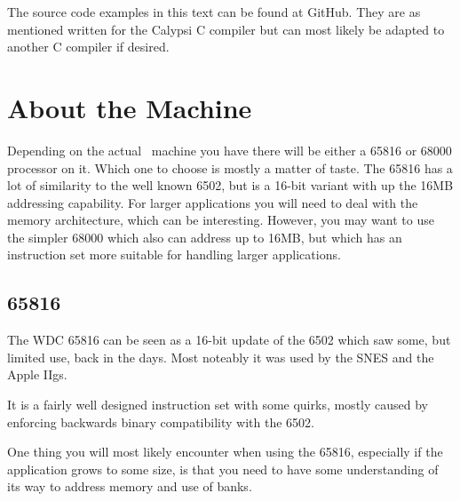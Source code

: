 The source code examples in this text can be found at GitHub. They are
as mentioned written for the Calypsi C compiler but can most likely be
adapted to another C compiler if desired.

\section*{About the Machine}

Depending on the actual \foenix\ machine you have there will be either
a 65816 or 68000 processor on it. Which one to choose is mostly a
matter of taste. The 65816 has a lot of similarity to the well known
6502, but is a 16-bit variant with up the 16MB addressing
capability. For larger applications you will need to deal with the
memory architecture, which can be interesting. However, you may want
to use the simpler 68000 which also can address up to 16MB, but which
has an instruction set more suitable for handling larger applications.

\begin{leftbar}
\subsection*{65816}

The WDC 65816 can be seen as a 16-bit update of the 6502 which saw
some, but limited use, back in the days. Most noteably it was used by
the SNES and the Apple IIgs.

It is a fairly well designed instruction set with some quirks, mostly
caused by enforcing backwards binary compatibility with the 6502.

One thing you will most likely encounter when using the 65816,
especially if the application grows to some size, is that you need to
have some understanding of its way to address memory and use of
banks.
\end{leftbar}


